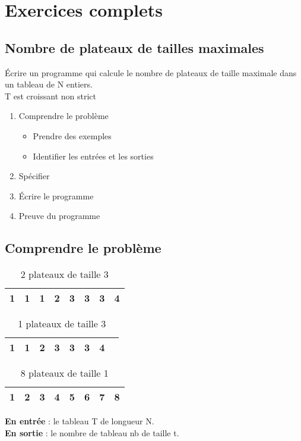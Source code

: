 \section{Exercices complets}
\subsection{Nombre de plateaux de tailles maximales}
\'Ecrire un programme qui calcule le nombre de plateaux de taille maximale dans un tableau de N entiers.\\
 T est croissant non strict
 \begin{enumerate}
	 \item Comprendre le problème
		 \begin{itemize}
			 \item Prendre des exemples
			 \item Identifier les entrées et les sorties
		 \end{itemize}
	 \item Spécifier 
	 \item \'Ecrire le programme 
	 \item Preuve du programme 
 \end{enumerate}
 \subsection{Comprendre le problème}
 \begin{table}[H]
	 \centering
	 \begin{tabular}{|c|c|c|c|c|c|c|c|}
		 \hline
		 1&1&1&2&3&3&3&4\\
		 \hline
	 \end{tabular}
	 \caption{2 plateaux de taille 3}
 \end{table}
 \begin{table}[H]
	 \centering
	 \begin{tabular}{|c|c|c|c|c|c|c|c|}
		 \hline
		 1&1&2&3&3&3&4\\
		 \hline
	 \end{tabular}
	 \caption{1 plateaux de taille 3}
 \end{table}
 \begin{table}[H]
	 \centering
	 \begin{tabular}{|c|c|c|c|c|c|c|c|}
		 \hline
		 1&2&3&4&5&6&7&8\\
		 \hline
	 \end{tabular}
	 \caption{8 plateaux de taille 1}
 \end{table}
 \textbf{En entrée} : le tableau T de longueur N.\\
 \textbf{En sortie} : le nombre de tableau nb de taille t.
